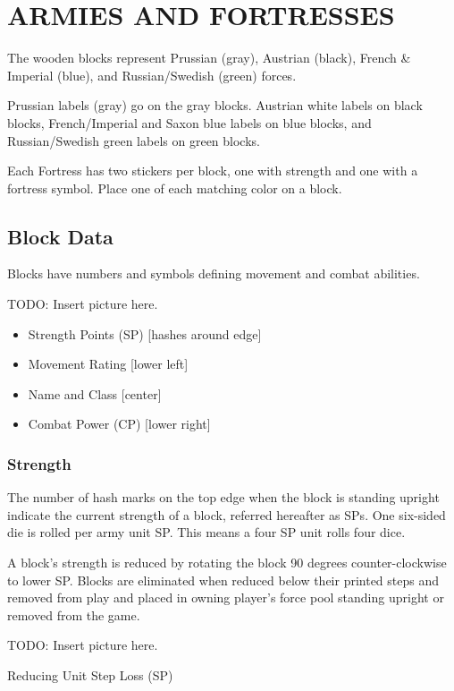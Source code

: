 \section{ARMIES AND FORTRESSES}

The wooden blocks represent Prussian (gray), Austrian (black), French \& Imperial (blue), and Russian/Swedish (green) forces.

Prussian labels (gray) go on the gray blocks. Austrian white labels on black blocks, French/Imperial and Saxon blue labels on blue blocks, and Russian/Swedish green labels on green blocks.

Each Fortress has two stickers per block, one with strength and one with a fortress symbol. Place one of each matching color on a block.

\subsection{Block Data}

Blocks have numbers and symbols defining movement and combat abilities.

TODO: Insert picture here.

\begin{itemize}
  \setlength\itemsep{-0.5em}
  \item Strength Points (SP) [hashes around edge]
  \item Movement Rating [lower left]
  \item Name and Class [center]
  \item Combat Power (CP) [lower right]
\end{itemize}

\subsubsection{Strength}
The number of hash marks on the top edge when the block is standing upright indicate the current strength of a block, referred hereafter as SPs. One six-sided die is rolled per army unit SP. This means a four SP unit rolls four dice.

A block’s strength is reduced by rotating the block 90 degrees counter-clockwise to lower SP. Blocks are eliminated when reduced below their printed steps and removed from play and placed in owning player’s force pool standing upright or removed from the game.

TODO: Insert picture here.

Reducing Unit Step Loss (SP)

